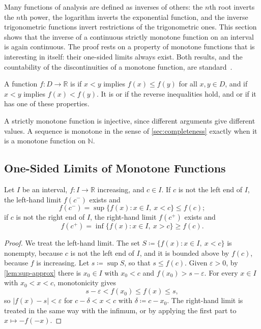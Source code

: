 Many functions of analysis are defined as inverses of others: the $n$th root inverts the $n$th power, the logarithm inverts the exponential function, and the inverse trigonometric functions invert restrictions of the trigonometric ones. This section shows that the inverse of a continuous strictly monotone function on an interval is again continuous. The proof rests on a property of monotone functions that is interesting in itself: their one-sided limits always exist. Both results, and the countability of the discontinuities of a monotone function, are standard~\cite{rudin1976,spivak2008calculus}.

\begin{definition}
\label{def:monotone-function}
A function $f\colon D\to\mathbb R$ is  if $x<y$ implies $f(x)\le f(y)$ for all $x,y\in D$, and  if $x<y$ implies $f(x)<f(y)$. It is  or  if the reverse inequalities hold, and  or  if it has one of these properties.
\end{definition}

A strictly monotone function is injective, since different arguments give different values. A sequence is monotone in the sense of \cref{sec:completeness} exactly when it is a monotone function on $\mathbb N$.

\subsection{One-Sided Limits of Monotone Functions}

\begin{theorem}
\label{thm:monotone-one-sided}
Let $I$ be an interval, $f\colon I\to\mathbb R$ increasing, and $c\in I$. If $c$ is not the left end of $I$, the left-hand limit $f(c^-)$ exists and
\[
f(c^-)=\sup\{f(x): x\in I,\ x<c\}\le f(c);
\]
if $c$ is not the right end of $I$, the right-hand limit $f(c^+)$ exists and
\[
f(c^+)=\inf\{f(x): x\in I,\ x>c\}\ge f(c).
\]
\end{theorem}

\begin{proof}
We treat the left-hand limit. The set $S\coloneqq\{f(x): x\in I,\ x<c\}$ is nonempty, because $c$ is not the left end of $I$, and it is bounded above by $f(c)$, because $f$ is increasing. Let $s\coloneqq\sup S$, so that $s\le f(c)$. Given $\varepsilon>0$, by \cref{lem:sup-approx} there is $x_0\in I$ with $x_0<c$ and $f(x_0)>s-\varepsilon$. For every $x\in I$ with $x_0<x<c$, monotonicity gives
\[
s-\varepsilon<f(x_0)\le f(x)\le s ,
\]
so $|f(x)-s|<\varepsilon$ for $c-\delta<x<c$ with $\delta\coloneqq c-x_0$. The right-hand limit is treated in the same way with the infimum, or by applying the first part to $x\mapsto-f(-x)$.
\end{proof}

